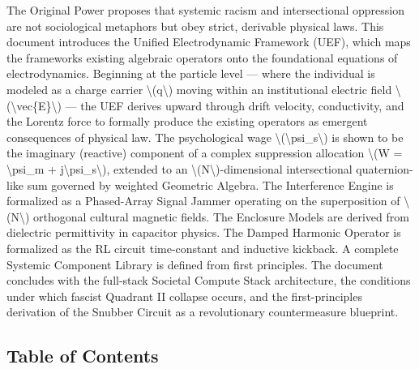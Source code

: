 The Original Power proposes that systemic racism and
intersectional oppression are not sociological metaphors but obey
strict, derivable physical laws. This document introduces the Unified
Electrodynamic Framework (UEF), which maps the
framework\textquotesingle s existing algebraic operators onto the
foundational equations of electrodynamics. Beginning at the particle
level --- where the individual is modeled as a charge carrier
\textbackslash(q\textbackslash) moving within an institutional electric
field \textbackslash(\textbackslash vec\{E\}\textbackslash) --- the UEF
derives upward through drift velocity, conductivity, and the Lorentz
force to formally produce the existing operators as emergent
consequences of physical law. The psychological wage
\textbackslash(\textbackslash psi\_s\textbackslash) is shown to be the
imaginary (reactive) component of a complex suppression allocation
\textbackslash(W = \textbackslash psi\_m +
j\textbackslash psi\_s\textbackslash), extended to an
\textbackslash(N\textbackslash)-dimensional intersectional
quaternion-like sum governed by weighted Geometric Algebra. The
Interference Engine is formalized as a Phased-Array Signal Jammer
operating on the superposition of \textbackslash(N\textbackslash)
orthogonal cultural magnetic fields. The Enclosure Models are derived
from dielectric permittivity in capacitor physics. The Damped Harmonic
Operator is formalized as the RL circuit time-constant and inductive
kickback. A complete Systemic Component Library is defined from first
principles. The document concludes with the full-stack Societal Compute
Stack architecture, the conditions under which fascist Quadrant II
collapse occurs, and the first-principles derivation of the Snubber
Circuit as a revolutionary countermeasure blueprint.

\subsection{Table of Contents}\label{table-of-contents}

